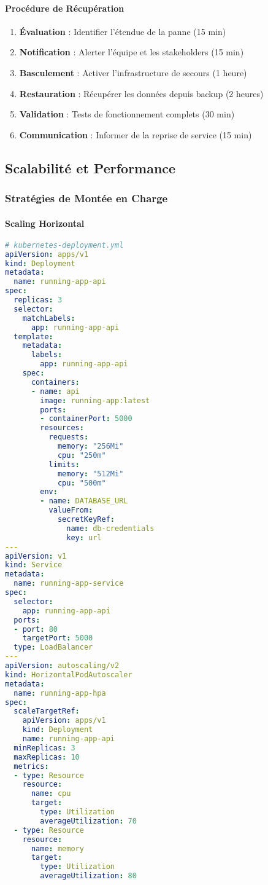 \paragraph{Procédure de Récupération}
\begin{enumerate}
    \item \textbf{Évaluation} : Identifier l'étendue de la panne (15 min)
    \item \textbf{Notification} : Alerter l'équipe et les stakeholders (15 min)
    \item \textbf{Basculement} : Activer l'infrastructure de secours (1 heure)
    \item \textbf{Restauration} : Récupérer les données depuis backup (2 heures)
    \item \textbf{Validation} : Tests de fonctionnement complets (30 min)
    \item \textbf{Communication} : Informer de la reprise de service (15 min)
\end{enumerate}

\subsection{Scalabilité et Performance}

\subsubsection{Stratégies de Montée en Charge}

\paragraph{Scaling Horizontal}
\begin{lstlisting}[language=yaml]
# kubernetes-deployment.yml
apiVersion: apps/v1
kind: Deployment
metadata:
  name: running-app-api
spec:
  replicas: 3
  selector:
    matchLabels:
      app: running-app-api
  template:
    metadata:
      labels:
        app: running-app-api
    spec:
      containers:
      - name: api
        image: running-app:latest
        ports:
        - containerPort: 5000
        resources:
          requests:
            memory: "256Mi"
            cpu: "250m"
          limits:
            memory: "512Mi"
            cpu: "500m"
        env:
        - name: DATABASE_URL
          valueFrom:
            secretKeyRef:
              name: db-credentials
              key: url
---
apiVersion: v1
kind: Service
metadata:
  name: running-app-service
spec:
  selector:
    app: running-app-api
  ports:
  - port: 80
    targetPort: 5000
  type: LoadBalancer
---
apiVersion: autoscaling/v2
kind: HorizontalPodAutoscaler
metadata:
  name: running-app-hpa
spec:
  scaleTargetRef:
    apiVersion: apps/v1
    kind: Deployment
    name: running-app-api
  minReplicas: 3
  maxReplicas: 10
  metrics:
  - type: Resource
    resource:
      name: cpu
      target:
        type: Utilization
        averageUtilization: 70
  - type: Resource
    resource:
      name: memory
      target:
        type: Utilization
        averageUtilization: 80
\end{lstlisting}

